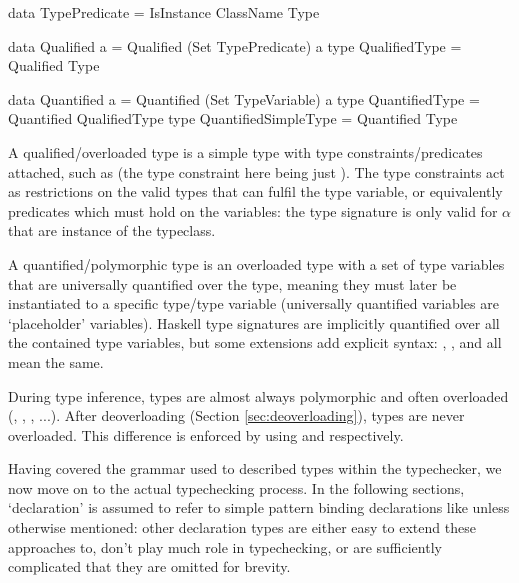 \documentclass[dissertation.tex]{subfiles}
\begin{document}
{{        \begin{haskellfigure}
        data TypePredicate = IsInstance ClassName Type

        data Qualified a = Qualified (Set TypePredicate) a
        type QualifiedType = Qualified Type

        data Quantified a = Quantified (Set TypeVariable) a
        type QuantifiedType = Quantified QualifiedType
        type QuantifiedSimpleType = Quantified Type
        \end{haskellfigure}

        A qualified/overloaded type is a simple type with type constraints/predicates attached, such as  (the type constraint here being just ). The type constraints act as restrictions on the valid types that can fulfil the type variable, or equivalently predicates which must hold on the variables: the type signature is only valid for \(\alpha\) that are instance of the  typeclass. 

        A quantified/polymorphic type is an overloaded type with a set of type variables that are universally quantified over the type, meaning they must later be instantiated to a specific type/type variable (universally quantified variables are `placeholder' variables). Haskell type signatures are implicitly quantified over all the contained type variables, but some extensions add explicit syntax: , , and  all mean the same.

        During type inference, types are almost always polymorphic and often overloaded (, , , ...). After deoverloading (Section \ref{sec:deoverloading}), types are never overloaded. This difference is enforced by using  and  respectively.

        Having covered the grammar used to described types within the typechecker, we now move on to the actual typechecking process. In the following sections, `declaration' is assumed to refer to simple pattern binding declarations like  unless otherwise mentioned: other declaration types are either easy to extend these approaches to, don't play much role in typechecking, or are sufficiently complicated that they are omitted for brevity.
    }
}
\end{document}
